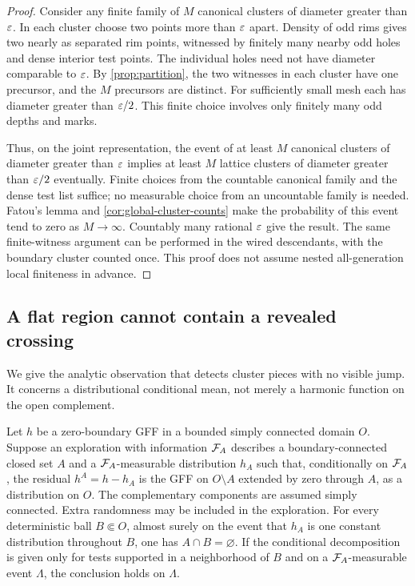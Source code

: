 \begin{proof}
Consider any finite family of $M$ canonical clusters of diameter
greater than $\varepsilon$. In each cluster choose two points more than
$\varepsilon$ apart. Density of
odd rims gives two nearly as separated rim points, witnessed by
finitely many nearby odd holes and dense interior test points.
The individual holes need not have diameter comparable to
$\varepsilon$. By \cref{prop:partition}, the two witnesses in each
cluster have one precursor, and the $M$ precursors are distinct.
For sufficiently small mesh each has diameter greater than
$\varepsilon/2$. This finite choice involves only finitely many odd
depths and marks.

Thus, on the joint representation, the event of at least $M$
canonical clusters of diameter greater than $\varepsilon$ implies at
least $M$ lattice clusters of diameter greater than $\varepsilon/2$
eventually. Finite choices from the countable canonical family
and the dense test list suffice; no measurable choice from an
uncountable family is needed. Fatou's lemma and
\cref{cor:global-cluster-counts} make the probability of this event
tend to zero as $M\to\infty$. Countably many rational $\varepsilon$
give the result. The same finite-witness argument can be performed
in the wired descendants, with the boundary cluster counted once.
This proof does not assume nested all-generation local finiteness
in advance.
\end{proof}

\subsection{A flat region cannot contain a revealed crossing}

We give the analytic observation that detects cluster pieces with
no visible jump. It concerns a distributional conditional mean,
not merely a harmonic function on the open complement.

\begin{lemma}
\label{lem:flat-patch}
Let $h$ be a zero-boundary GFF in a bounded simply connected domain
$O$. Suppose an exploration with information $\mathcal F_A$ describes a
boundary-connected closed set $A$ and a $\mathcal F_A$-measurable distribution $h_A$ such that,
conditionally on $\mathcal F_A$, the residual $h^A=h-h_A$ is the GFF on
$O\setminus A$ extended by zero through $A$, as a distribution on $O$.
The complementary components are assumed simply connected. Extra
randomness may be included in the exploration. For every
deterministic ball $B\Subset O$, almost surely on the event that
$h_A$ is one constant distribution throughout $B$, one has
$A\cap B=\varnothing$. If the conditional decomposition is given
only for tests supported in a neighborhood of $B$ and on a
$\mathcal F_A$-measurable event $\Lambda$, the conclusion holds on $\Lambda$.
\end{lemma}

